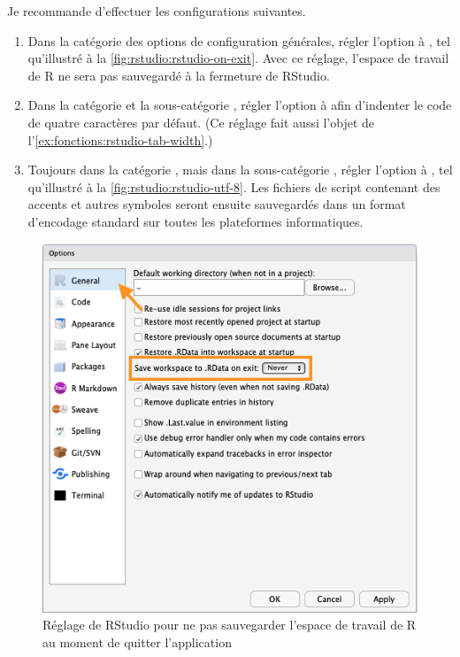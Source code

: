 Je recommande d'effectuer les configurations suivantes.
\begin{enumerate}
\item Dans la catégorie des options de configuration générales, régler
  l'option  à , tel
  qu'illustré à la \autoref{fig:rstudio:rstudio-on-exit}. Avec ce
  réglage, l'espace de travail de R ne sera pas sauvegardé à la
  fermeture de RStudio.
\item Dans la catégorie  et la sous-catégorie
  , régler l'option  à  afin
  d'indenter le code de quatre caractères par défaut. (Ce réglage fait
  aussi l'objet de l'\autoref{ex:fonctions:rstudio-tab-width}.)
\item Toujours dans la catégorie , mais dans la
  sous-catégorie , régler l'option  à , tel qu'illustré à la
  \autoref{fig:rstudio:rstudio-utf-8}. Les fichiers de script
  contenant des accents et autres symboles seront ensuite sauvegardés
  dans un format d'encodage standard sur toutes les plateformes
  informatiques.
\end{enumerate}

\begin{figure}
  \centering
  \includegraphics{images/rstudio-on-exit}
  \caption{Réglage de RStudio pour ne pas sauvegarder l'espace
    de travail de R au moment de quitter l'application}
  \label{fig:rstudio:rstudio-on-exit}
\end{figure}

